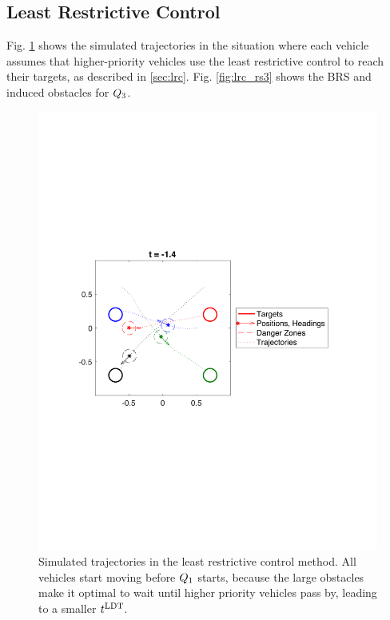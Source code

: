 \subsection{Least Restrictive Control}
Fig. \ref{fig:lrc_traj} shows the simulated trajectories in the situation where each vehicle assumes that higher-priority vehicles use the least restrictive control to reach their targets, as described in \ref{sec:lrc}. Fig. \ref{fig:lrc_rs3} shows the BRS and induced obstacles for $Q_3$.

\begin{figure}[H]
  \centering
  \includegraphics[width=\columnwidth]{"fig/lrc_traj"}
  \caption{Simulated trajectories in the least restrictive control method. All vehicles start moving before $Q_1$ starts, because the large obstacles make it optimal to wait until higher priority vehicles pass by, leading to a smaller $t^\text{LDT}$. }
  \label{fig:lrc_traj}
\end{figure}

